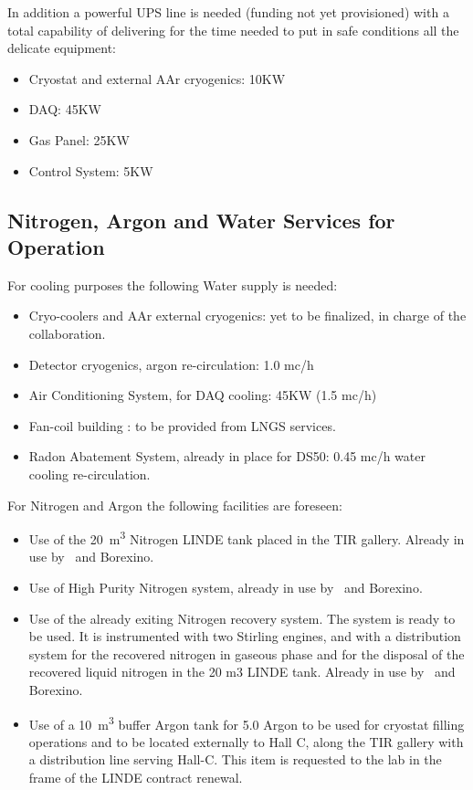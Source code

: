 In addition a powerful UPS line is needed (funding not yet provisioned) with a total capability of delivering \TotalUPSPowerConsumption for the time needed to put in safe conditions all the delicate equipment: 
\begin{itemize}
\item Cryostat and external AAr cryogenics: 10KW
\item DAQ: 45KW 
\item Gas Panel: 25KW 
\item Control System: 5KW 
\end{itemize}

\subsection{Nitrogen, Argon and Water Services for \DSks Operation}
\label{sec:NitrogenArgonAndWater}

For cooling purposes the following Water supply is needed:
\begin{itemize} 
\item Cryo-coolers and AAr external cryogenics: yet to be finalized, in charge of the collaboration. 
\item Detector cryogenics, argon re-circulation: 1.0 mc/h 
\item Air Conditioning System, for DAQ cooling: 45KW (1.5 mc/h)
\item Fan-coil building : to be provided from LNGS services.
\item Radon Abatement System, already in place for DS50: 0.45 mc/h water cooling re-circulation.
\end{itemize} 

\vspace{\baselineskip}

For Nitrogen and Argon the following facilities are foreseen:
\begin{itemize}
\item Use of the \SI{20}{\cubic\meter} Nitrogen LINDE tank placed in the TIR gallery. Already in use by \DSf\ and Borexino. 
\item Use of High Purity Nitrogen system, already in use by \Dsf\ and Borexino.
\item Use of the already exiting Nitrogen recovery system. The system is  ready to be used. It is instrumented with two Stirling engines, and with a distribution system for the recovered nitrogen in gaseous phase and for the disposal of the recovered liquid nitrogen in the 20 m3 LINDE tank. Already in use by \Dsf\ and Borexino.
\item Use of a \SI{10}{\cubic\meter} buffer Argon tank for 5.0 Argon to be used for cryostat filling operations and to be located externally to Hall C, along the TIR gallery with a distribution line serving Hall-C. This item is requested to the lab in the frame of the LINDE contract renewal.  
\end{itemize}

